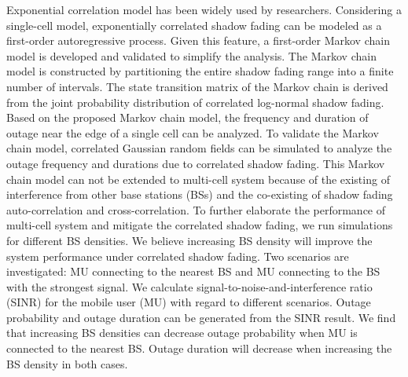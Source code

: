 \par Exponential correlation model \cite{gudmundson1991correlation} has been widely used by researchers. Considering a single-cell model, exponentially correlated shadow fading can be modeled as a first-order autoregressive process. Given this feature, a first-order Markov chain model is developed and validated  to simplify the analysis. The Markov chain model is constructed by partitioning the entire shadow fading range into a finite number of intervals. The state transition matrix of the Markov chain is derived from the joint probability distribution of correlated log-normal shadow fading. Based on the proposed Markov chain model, the frequency and duration of outage near the edge of a single cell can be analyzed. To validate the Markov chain model, correlated Gaussian random fields can be simulated to analyze the outage frequency and durations due to correlated shadow fading. 
This Markov chain model can not be extended to multi-cell system because of the existing of interference from other base stations (BSs) and the co-existing of shadow fading auto-correlation and cross-correlation. To further elaborate the performance of multi-cell system and mitigate the correlated shadow fading, we run simulations for different BS densities. We believe increasing BS density will improve the system performance under correlated shadow fading. Two scenarios are investigated: MU connecting to the nearest BS and MU connecting to the BS with the strongest signal. We calculate signal-to-noise-and-interference ratio (SINR) for the mobile user (MU) with regard to different scenarios. Outage probability and outage duration can be generated from the SINR result. We find that increasing BS densities can decrease outage probability when MU is connected to the nearest BS. Outage duration will decrease when increasing the BS density in both cases. 


